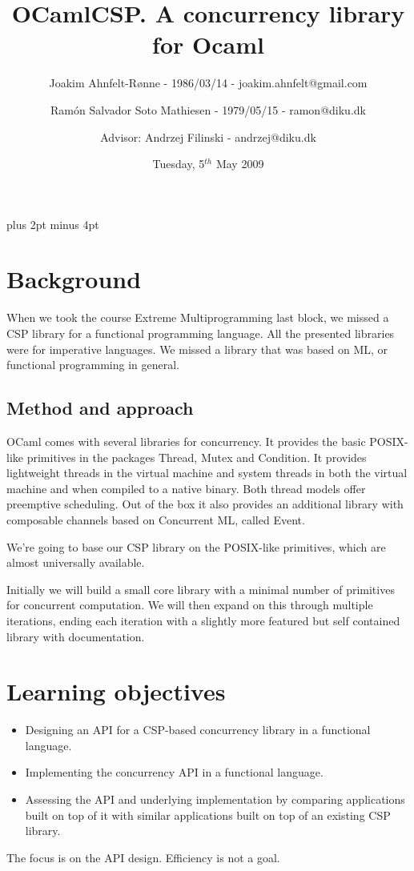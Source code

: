 \documentclass[a4paper,12pt]{article}
\title{OCamlCSP. A concurrency library for Ocaml}
\author{Joakim Ahnfelt-Rønne - 1986/03/14 - joakim.ahnfelt@gmail.com \and 
        Ramón Salvador Soto Mathiesen - 1979/05/15 - ramon@diku.dk \and
        Advisor: Andrzej Filinski - andrzej@diku.dk}
\date{Tuesday, 5$^{th}$ May 2009}
\begin{document}
\parindent=0pt
\parskip=8pt plus 2pt minus 4pt

\maketitle
\newpage

\section*{Background}
When we took the course Extreme Multiprogramming last block, we missed 
a CSP\cite{hoare} library for a functional programming language. All the 
presented libraries were for imperative languages. We missed a library that 
was based on ML, or functional programming in general.

\subsection*{Method and approach}
OCaml comes with several libraries for concurrency.
It provides the basic POSIX-like primitives in the packages Thread,
Mutex and Condition. It provides lightweight threads in the virtual
machine and system threads in both the virtual machine and when
compiled to a native binary. Both thread models offer preemptive
scheduling. Out of the box it also provides an additional library 
with composable channels based on Concurrent ML, called Event. 

We're going to base our CSP library on the POSIX-like primitives,
which are almost universally available.

Initially we will build a small core library with a minimal number
of primitives for concurrent computation. We will then expand on this
through multiple iterations, ending each iteration with a slightly
more featured but self contained library with documentation.


\section*{Learning objectives} %
\begin{itemize}
 \item Designing an API for a CSP-based concurrency library in a functional
   language.
 \item Implementing the concurrency API in a functional language.
 \item Assessing the API and underlying implementation by comparing
   applications built on top of it with similar applications built on
   top of an existing CSP library.
\end{itemize}
The focus is on the API design. Efficiency is not a goal.
\end{document}
